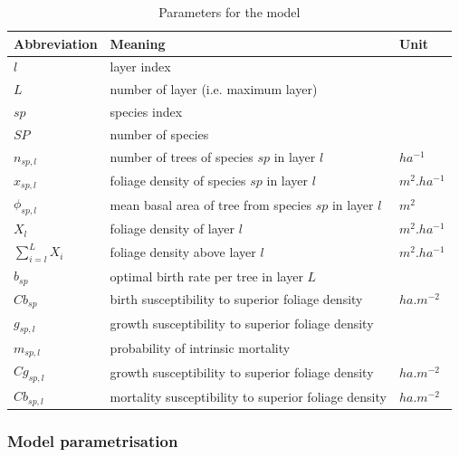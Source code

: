 \documentclass{article}
\begin{document}
\begin{table}[H]
    \centering
    \begin{tabular}{l l l}
    \hline
    \hline
    \textbf{Abbreviation} & \textbf{Meaning} & \textbf{Unit} \\
    \hline
    \hline
    $l$            & layer index                                                 &          \\
    $L$            & number of layer (i.e. maximum layer)                        &          \\
    $sp$           & species index                                               &          \\
    $SP$           & number of species                                           &            \\
    $n_{sp,l}$     & number of trees of species $sp$ in layer $l$                & $ha^{-1}$  \\    
    $x_{sp,l}$     & foliage density of species $sp$ in layer $l$                & $m^2.ha^{-1}$  \\
    $\phi_{sp,l}$     & mean basal area of tree from species $sp$ in layer $l$    & $m^2$  \\
    $X_{l}$        & foliage density of layer $l$                                & $m^2.ha^{-1}$  \\ 
    $\sum_{i = l}^{L} X_{i}$     & foliage density above layer $l$      & $m^2.ha^{-1}$  \\ 
    $b_{sp}$       & optimal birth rate per tree in layer $L$    &  \\
    $Cb_{sp}$      & birth susceptibility to superior foliage density    & $ha.m^{-2}$           \\
    $g_{sp,l}$     & growth susceptibility to superior foliage density           &  \\
    $m_{sp,l}$     & probability of intrinsic mortality           & \\
    $Cg_{sp,l}$    & growth susceptibility to superior foliage density            &   $ha.m^{-2}$  \\
    $Cb_{sp,l}$    & mortality susceptibility to superior foliage density            & $ha.m^{-2}$    \\
    \hline
    \hline
    \end{tabular}
    \caption{Parameters for the model}
    \label{tab:coef}
\end{table}

\subsubsection{Model parametrisation}
\end{document}
